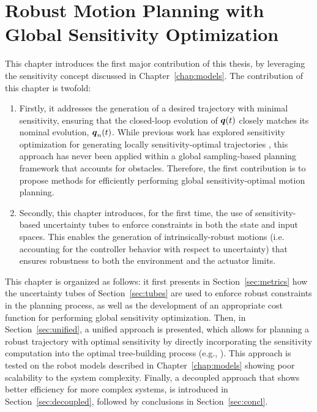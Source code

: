 \chapter{Robust Motion Planning with Global Sensitivity Optimization}\label{chap:samp}
\localtableofcontents \newpage

This chapter introduces the first major contribution of this thesis, by leveraging the sensitivity concept discussed in Chapter~\ref{chap:models}.
The contribution of this chapter is twofold:
\begin{enumerate}
    \item Firstly, it addresses the generation of a desired trajectory with minimal sensitivity, ensuring that the closed-loop evolution of $\boldsymbol{q}(t)$ closely matches its nominal evolution, $\boldsymbol{q}_n(t)$. 
    While previous work has explored sensitivity optimization for generating locally sensitivity-optimal trajectories \cite{cPi, cTh}, this approach has never been applied within a global sampling-based planning framework that accounts for obstacles. 
    Therefore, the first contribution is to propose methods for efficiently performing global sensitivity-optimal motion planning.
    \item Secondly, this chapter introduces, for the first time, the use of sensitivity-based uncertainty tubes to enforce constraints in both the state and input spaces. 
    This enables the generation of intrinsically-robust motions (i.e. accounting for the controller behavior with respect to uncertainty) that ensures robustness to both the environment and the actuator limits.
\end{enumerate}
This chapter is organized as follows: it first presents in Section~\ref{sec:metrics} how the uncertainty tubes of Section~\ref{sec:tubes} are used to enforce robust constraints in the planning process, as well as the development of an appropriate cost function for performing global sensitivity optimization.
Then, in Section~\ref{sec:unified}, a unified approach is presented, which allows for planning a robust trajectory with optimal sensitivity by directly incorporating the sensitivity computation into the optimal tree-building process (e.g., ). 
This approach is tested on the robot models described in Chapter~\ref{chap:models} showing poor scalability to the system complexity.
Finally, a decoupled approach that shows better efficiency for more complex systems, is introduced in Section~\ref{sec:decoupled}, followed by conclusions in Section~\ref{sec:concl}.

